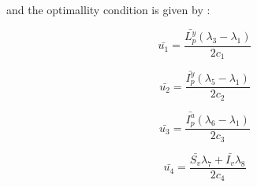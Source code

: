 and the optimallity condition is given by :
	
	\begin{equation}
		\bar{u_1} = \frac{\bar{L^y_p}(\lambda_3-\lambda_1)}{2c_1}
	\end{equation}
	
	\begin{equation}
		\bar{u_2} = \frac{\bar{I^y_p}(\lambda_5 -\lambda_1)}{2c_2}
	\end{equation}
	
	\begin{equation}
		\bar{u_3} = \frac{\bar{I^a_p}(\lambda_6-\lambda_1)}{2c_3}
	\end{equation}
	
	\begin{equation}
		\bar{u_4} = \frac{\bar{S_v}\lambda_7 +\bar{I_v}\lambda_8}{2c_4}
	\end{equation}